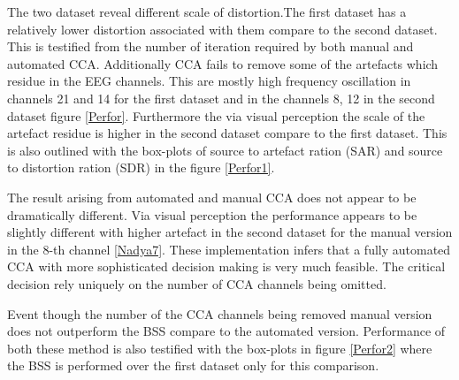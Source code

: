 The two dataset reveal different scale of distortion.The first dataset has a relatively lower distortion associated with them compare to the second dataset. This is testified from the number of iteration required by both manual and automated CCA. Additionally CCA fails to remove some of the artefacts which residue in the EEG channels. This are mostly high frequency oscillation in channels 21 and 14 for the first dataset and in the channels 8, 12 in the second dataset figure \ref{Perfor}. Furthermore the via visual perception the scale of the artefact residue is higher in the second dataset compare to the first dataset. This is also outlined with the box-plots of source to artefact ration (SAR) and source to distortion ration (SDR) in the figure \ref{Perfor1}.


The result arising from automated and manual CCA does not appear to be dramatically different. Via visual perception the performance appears to be slightly different with higher artefact in the second dataset for the manual version in the 8-th channel \ref{Nadya7}. These implementation infers that a fully automated CCA with more sophisticated decision making is very much feasible. The critical decision rely uniquely on the number of CCA channels being omitted.

Event though the number of the CCA channels being removed manual version does not outperform the BSS compare to the automated version. Performance of both these method is also testified with the box-plots in figure \ref{Perfor2} where the BSS is performed over the first dataset only for this comparison.



